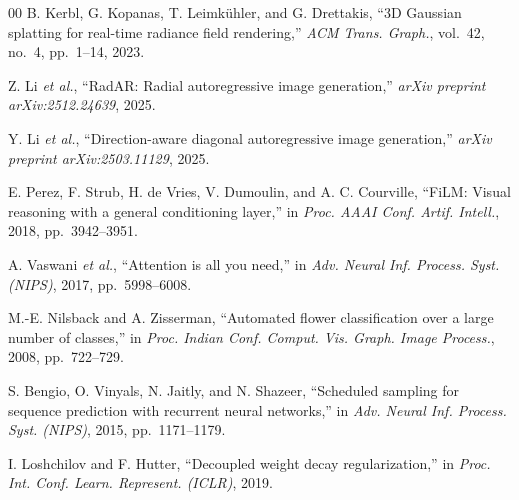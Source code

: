 \documentclass[conference]{IEEEtran}
\begin{document}
\begin{thebibliography}{00}
B. Kerbl, G. Kopanas, T. Leimk{\"u}hler, and G. Drettakis,
``3D Gaussian splatting for real-time radiance field rendering,''
\textit{ACM Trans. Graph.}, vol.~42, no.~4, pp.~1--14, 2023.

Z. Li \textit{et al.},
``RadAR: Radial autoregressive image generation,''
\textit{arXiv preprint arXiv:2512.24639}, 2025.

Y. Li \textit{et al.},
``Direction-aware diagonal autoregressive image generation,''
\textit{arXiv preprint arXiv:2503.11129}, 2025.

E. Perez, F. Strub, H. de Vries, V. Dumoulin, and A. C. Courville,
``FiLM: Visual reasoning with a general conditioning layer,''
in \textit{Proc. AAAI Conf. Artif. Intell.}, 2018, pp.~3942--3951.

A. Vaswani \textit{et al.},
``Attention is all you need,''
in \textit{Adv. Neural Inf. Process. Syst. (NIPS)}, 2017, pp.~5998--6008.

M.-E. Nilsback and A. Zisserman,
``Automated flower classification over a large number of classes,''
in \textit{Proc. Indian Conf. Comput. Vis. Graph. Image Process.}, 2008,
pp.~722--729.

S. Bengio, O. Vinyals, N. Jaitly, and N. Shazeer,
``Scheduled sampling for sequence prediction with recurrent neural
networks,''
in \textit{Adv. Neural Inf. Process. Syst. (NIPS)}, 2015, pp.~1171--1179.

I. Loshchilov and F. Hutter,
``Decoupled weight decay regularization,''
in \textit{Proc. Int. Conf. Learn. Represent. (ICLR)}, 2019.

\end{thebibliography}
\end{document}
